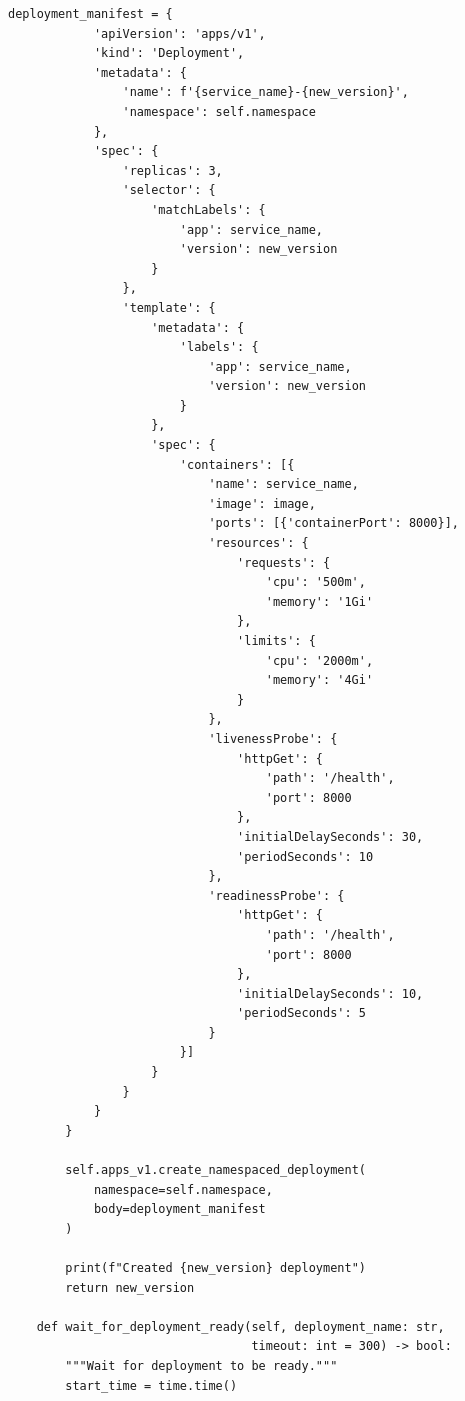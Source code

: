 \begin{lstlisting}[style=python, caption=scripts/blue_green_deploy.py]
        deployment_manifest = {
            'apiVersion': 'apps/v1',
            'kind': 'Deployment',
            'metadata': {
                'name': f'{service_name}-{new_version}',
                'namespace': self.namespace
            },
            'spec': {
                'replicas': 3,
                'selector': {
                    'matchLabels': {
                        'app': service_name,
                        'version': new_version
                    }
                },
                'template': {
                    'metadata': {
                        'labels': {
                            'app': service_name,
                            'version': new_version
                        }
                    },
                    'spec': {
                        'containers': [{
                            'name': service_name,
                            'image': image,
                            'ports': [{'containerPort': 8000}],
                            'resources': {
                                'requests': {
                                    'cpu': '500m',
                                    'memory': '1Gi'
                                },
                                'limits': {
                                    'cpu': '2000m',
                                    'memory': '4Gi'
                                }
                            },
                            'livenessProbe': {
                                'httpGet': {
                                    'path': '/health',
                                    'port': 8000
                                },
                                'initialDelaySeconds': 30,
                                'periodSeconds': 10
                            },
                            'readinessProbe': {
                                'httpGet': {
                                    'path': '/health',
                                    'port': 8000
                                },
                                'initialDelaySeconds': 10,
                                'periodSeconds': 5
                            }
                        }]
                    }
                }
            }
        }

        self.apps_v1.create_namespaced_deployment(
            namespace=self.namespace,
            body=deployment_manifest
        )

        print(f"Created {new_version} deployment")
        return new_version

    def wait_for_deployment_ready(self, deployment_name: str,
                                  timeout: int = 300) -> bool:
        """Wait for deployment to be ready."""
        start_time = time.time()


\end{lstlisting}

